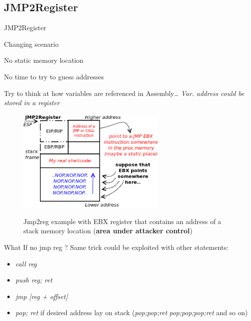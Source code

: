 \subsection{JMP2Register}
\begin{frame}{JMP2Register}

	\begin{block}{Changing scenario}
	\begin{list}{-}{}
	\item No static memory location
	\item No time to try to guess addresses
	\end{list}
	Try to think at how variables are referenced in Assembly\ldots
	\emph{Var. address could be stored in a register}
	\end{block}
	
	\framebreak
	
	\begin{figure}
        \includegraphics[width=0.65\textwidth]{imgs/jmp2reg.png}
        \label{fig:jmp2reg}
        \caption{Jmp2reg example with EBX register that contains an address of a stack memory location ({\bf area under attacker control})}
    \end{figure}	
	
	\framebreak
	
	\begin{block}{What If no jmp reg ?}
	Same trick could be exploited with other statements:
	\begin{itemize}
	\item \emph{call reg}
	\item \emph{push reg; ret}
	\item \emph{jmp [reg + offset]}
	\item \emph{pop; ret} if desired address lay on stack (\emph{pop;pop;ret} \emph{pop;pop;pop;ret} and so on)
	\end{itemize}
	\end{block}
	
\end{frame}

